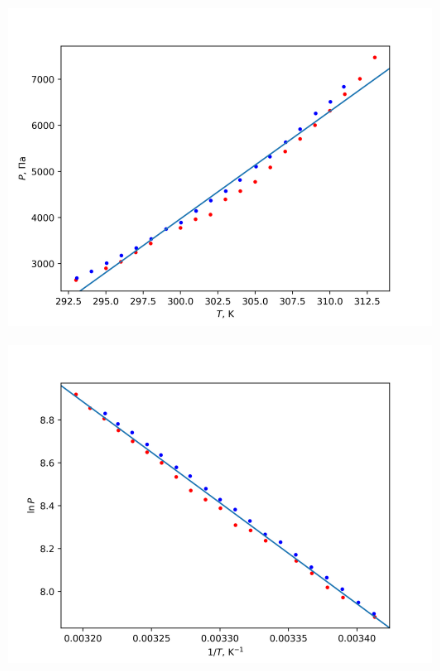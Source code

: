 \begin{figure}[ht!]
    \centering\includegraphics[width=0.8\linewidth]{img/plot1}
\end{figure}
\begin{figure}[ht!]
    \centering\includegraphics[width=0.8\linewidth]{img/plot2}
\end{figure}

